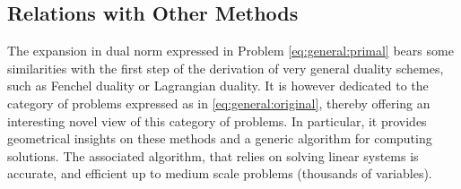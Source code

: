 
\subsection{Relations with Other Methods}

The expansion in dual norm expressed in Problem \eqref{eq:general:primal} bears
some similarities with the first step of the derivation of very general duality
schemes, such as Fenchel duality or Lagrangian duality.
It is however dedicated to the category of problems expressed as in
\eqref{eq:general:original}, thereby offering an interesting novel view of this
category of problems.
In particular, it provides geometrical insights on these methods and a generic
algorithm for computing solutions.  The associated algorithm, that relies on
solving linear systems is accurate, and efficient up to medium scale problems
(thousands of variables).


%  



